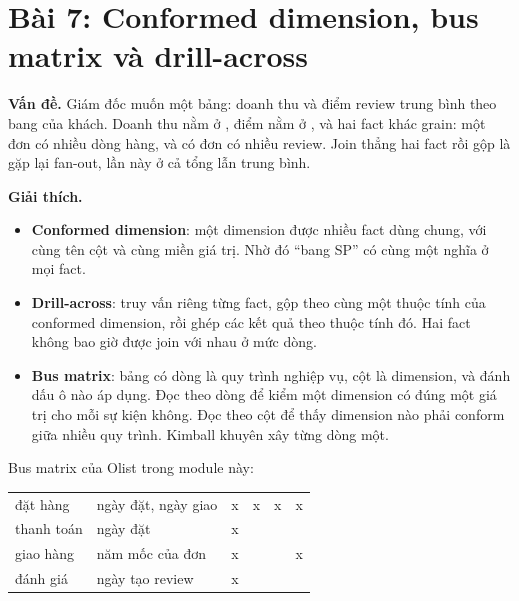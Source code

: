 \section{Bài 7: Conformed dimension, bus matrix và drill-across}

\textbf{Vấn đề.} Giám đốc muốn một bảng: doanh thu và điểm review trung bình theo bang của khách. Doanh thu nằm ở , điểm nằm ở , và hai fact khác grain: một đơn có nhiều dòng hàng, và có đơn có nhiều review. Join thẳng hai fact rồi gộp là gặp lại fan-out, lần này ở cả tổng lẫn trung bình.

\textbf{Giải thích.}
\begin{itemize}
  \item \textbf{Conformed dimension}: một dimension được nhiều fact dùng chung, với cùng tên cột và cùng miền giá trị. Nhờ đó ``bang SP'' có cùng một nghĩa ở mọi fact.
  \item \textbf{Drill-across}: truy vấn riêng từng fact, gộp theo cùng một thuộc tính của conformed dimension, rồi ghép các kết quả theo thuộc tính đó. Hai fact không bao giờ được join với nhau ở mức dòng.
  \item \textbf{Bus matrix}: bảng có dòng là quy trình nghiệp vụ, cột là dimension, và đánh dấu ô nào áp dụng. Đọc theo dòng để kiểm một dimension có đúng một giá trị cho mỗi sự kiện không. Đọc theo cột để thấy dimension nào phải conform giữa nhiều quy trình. Kimball khuyên xây từng dòng một.
\end{itemize}

Bus matrix của Olist trong module này:

\begin{xltabular}{\textwidth}{@{}P{2.3cm} L P{1.9cm} P{1.9cm} P{1.9cm} P{2.3cm}@{}}
\toprule
{} &  &  &  &  &  \\
\midrule
\endhead
\bottomrule
\endfoot
đặt hàng & ngày đặt, ngày giao & x & x & x & x \\
thanh toán & ngày đặt & x & & & \\
giao hàng & năm mốc của đơn & x & & & x \\
đánh giá & ngày tạo review & x & & & \\
\end{xltabular}

